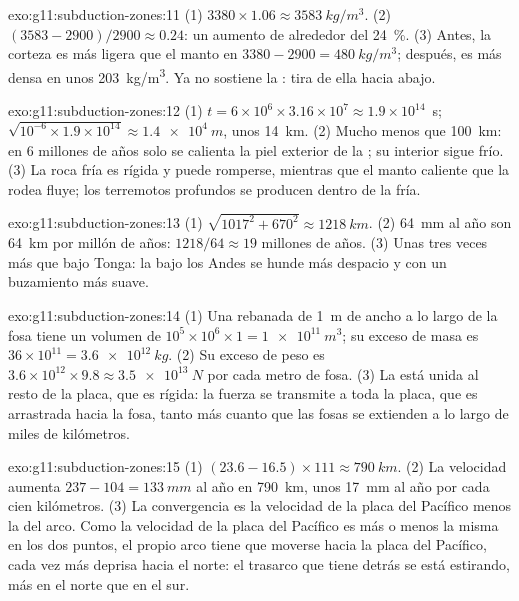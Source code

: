 \begin{solution}{exo:g11:subduction-zones:11}
(1) $3380 \times 1.06 \approx \qty{3583}{kg/m^3}$. (2)
$(3583 - 2900)/2900 \approx 0.24$: un aumento de alrededor del \qty{24}{\percent}.
(3) Antes, la corteza es más ligera que el manto en
$3380 - 2900 = \qty{480}{kg/m^3}$; después, es más densa en unos
\qty{203}{kg/m^3}. Ya no sostiene la : tira de ella hacia abajo.
\end{solution}

\begin{solution}{exo:g11:subduction-zones:12}
(1) $t = 6 \times 10^6 \times 3.16 \times 10^7 \approx 1.9 \times 10^{14}$~s;
$\sqrt{10^{-6} \times 1.9 \times 10^{14}} \approx \qty{1.4e4}{m}$, unos
\qty{14}{km}. (2) Mucho menos que \qty{100}{km}: en 6 millones de años solo se
calienta la piel exterior de la ; su interior sigue frío. (3) La roca fría
es rígida y puede romperse, mientras que el manto caliente que la rodea fluye;
los terremotos profundos se producen dentro de la  fría.
\end{solution}

\begin{solution}{exo:g11:subduction-zones:13}
(1) $\sqrt{1017^2 + 670^2} \approx \qty{1218}{km}$. (2) \qty{64}{mm} al año
son \qty{64}{km} por millón de años: $1218/64 \approx 19$ millones de años.
(3) Unas tres veces más que bajo Tonga: la  bajo los Andes se hunde más
despacio y con un buzamiento más suave.
\end{solution}

\begin{solution}{exo:g11:subduction-zones:14}
(1) Una rebanada de \qty{1}{m} de ancho a lo largo de la fosa tiene un volumen
de $10^5 \times 10^6 \times 1 = \qty{1e11}{m^3}$; su exceso de masa es
$36 \times 10^{11} = \qty{3.6e12}{kg}$. (2) Su exceso de peso es
$3.6 \times 10^{12} \times 9.8 \approx \qty{3.5e13}{N}$ por cada metro de
fosa. (3) La  está unida al resto de la placa, que es rígida: la fuerza se
transmite a toda la placa, que es arrastrada hacia la fosa, tanto más cuanto
que las fosas se extienden a lo largo de miles de kilómetros.
\end{solution}

\begin{solution}{exo:g11:subduction-zones:15}
(1) $(23.6 - 16.5) \times 111 \approx \qty{790}{km}$. (2) La velocidad
aumenta $237 - 104 = \qty{133}{mm}$ al año en \qty{790}{km}, unos
\qty{17}{mm} al año por cada cien kilómetros. (3) La convergencia es la
velocidad de la placa del Pacífico menos la del arco. Como la velocidad de la
placa del Pacífico es más o menos la misma en los dos puntos, el propio arco
tiene que moverse hacia la placa del Pacífico, cada vez más deprisa hacia el
norte: el trasarco que tiene detrás se está estirando, más en el norte que en
el sur.
\end{solution}

